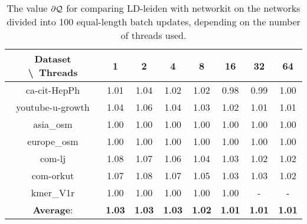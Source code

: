 \begin{table}[H]
	\centering
	\begin{tabular}{|c|c|c|c|c|c|c|c|}
		\hline
		Dataset \textbackslash\ Threads & 1 & 2 & 4 & 8 & 16 & 32 & 64 \\
		\hline
		ca-cit-HepPh & 1.01 & 1.04 & 1.02 & 1.02 & 0.98 & 0.99 & 1.00 \\
		\hline
		youtube-u-growth & 1.04 & 1.06 & 1.04 & 1.03 & 1.02 & 1.01 & 1.01 \\
		\hline
		asia\_osm & 1.00 & 1.00 & 1.00 & 1.00 & 1.00 & 1.00 & 1.00 \\
		\hline
		europe\_osm & 1.00 & 1.00 & 1.00 & 1.00 & 1.00 & 1.00 & 1.00 \\
		\hline
		com-lj & 1.08 & 1.07 & 1.06 & 1.04 & 1.03 & 1.02 & 1.02 \\
		\hline
		com-orkut & 1.07 & 1.08 & 1.07 & 1.05 & 1.03 & 1.03 & 1.02 \\
		\hline
		kmer\_V1r & 1.00 & 1.00 & 1.00 & 1.00 & 1.00 & - & - \\
		\hline
		\textbf{Average}: & \textbf{1.03} & \textbf{1.03} & \textbf{1.03} & \textbf{1.02} & \textbf{1.01} & \textbf{1.01} & \textbf{1.01} \\
		\hline
	\end{tabular}
\caption{The value $\partial\mathcal{Q}$ for comparing LD-leiden with networkit on the networks divided into 100 equal-length batch updates, depending on the number of threads used.}
\label{T:scalling:lastM:100:LD-leiden to networkit}
\end{table}